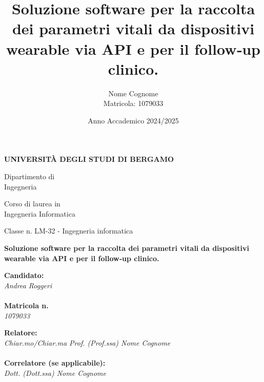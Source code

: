 \documentclass[12pt,a4paper,oneside]{report}
\title{\Huge\textbf{Soluzione software per la raccolta dei parametri vitali da dispositivi wearable via API e per il follow‑up clinico.}}
\author{Nome Cognome\\Matricola: 1079033}
\date{Anno Accademico 2024/2025}
\begin{document}
\begin{titlepage}
    \begin{center}
        {\fontsize{18}{22}\bfseries UNIVERSITÀ DEGLI STUDI DI BERGAMO}
    \end{center}

    \vspace{1cm}

    \begin{flushleft}
        {\fontsize{14}{18} Dipartimento di}\\
        {\fontsize{14}{18} Ingegneria}

        \vspace{1cm}

        {\fontsize{14}{18} Corso di laurea in}\\
        {\fontsize{14}{18} Ingegneria Informatica}

        \vspace{0.5cm}

        {\fontsize{14}{18} Classe n. LM-32 - Ingegneria informatica}
    \end{flushleft}

    \vspace{2.5cm}

    \begin{center}
        {\fontsize{20}{24}\bfseries Soluzione software per la raccolta dei parametri vitali}
        {\fontsize{20}{24}\bfseries da dispositivi wearable via API e per il follow‑up clinico.}
    \end{center}

    \vfill

    \begin{flushleft}
        \begin{minipage}[t]{0.47\textwidth}
            {\fontsize{12}{14}\selectfont\textbf{Candidato:}}\\
            {\fontsize{14}{18}\selectfont\textit{Andrea Roggeri}}\\
            \vspace{0.5cm}\\
            {\fontsize{12}{14}\selectfont\textbf{Matricola n.}}\\
            {\fontsize{14}{18}\selectfont\textit{1079033}}
        \end{minipage}
        \hfill
        \begin{minipage}[t]{0.47\textwidth}
            {\fontsize{12}{14}\selectfont\textbf{Relatore:}}\\
            {\fontsize{14}{18}\selectfont\textit{Chiar.mo/Chiar.ma Prof. (Prof.ssa) Nome Cognome}}\\
            \vspace{0.5cm}\\
            {\fontsize{12}{14}\selectfont\textbf{Correlatore (se applicabile):}}\\
            {\fontsize{14}{18}\selectfont\textit{Dott. (Dott.ssa) Nome Cognome}}
        \end{minipage}\end{flushleft}


\end{titlepage}
\end{document}
